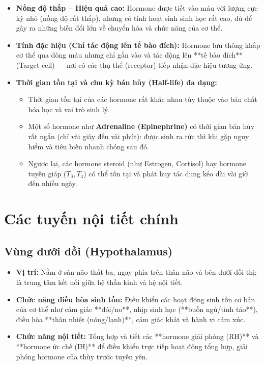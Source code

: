 \begin{itemize}
    \item \textbf{Nồng độ thấp -- Hiệu quả cao:} Hormone được tiết vào máu với lượng cực kỳ nhỏ (nồng độ rất thấp), nhưng có tính hoạt sinh sinh học rất cao, đủ để gây ra những biến đổi lớn về chuyển hóa và chức năng của cơ thể.
    \item \textbf{Tính đặc hiệu (Chỉ tác động lên tế bào đích):} Hormone lưu thông khắp cơ thể qua dòng máu nhưng chỉ gắn vào và tác động lên **tế bào đích** (Target cell) — nơi có các thụ thể (receptor) tiếp nhận đặc hiệu tương ứng.
    \item \textbf{Thời gian tồn tại và chu kỳ bán hủy (Half-life) đa dạng:}
    \begin{itemize}
        \item Thời gian tồn tại của các hormone rất khác nhau tùy thuộc vào bản chất hóa học và vai trò sinh lý.
        \item Một số hormone như \textbf{Adrenaline (Epinephrine)} có thời gian bán hủy rất ngắn (chỉ vài giây đến vài phút): được sinh ra tức thì khi gặp nguy hiểm và tiêu biến nhanh chóng sau đó.
        \item Ngược lại, các hormone steroid (như Estrogen, Cortisol) hay hormone tuyến giáp ($T_3, T_4$) có thể tồn tại và phát huy tác dụng kéo dài vài giờ đến nhiều ngày.
    \end{itemize}
\end{itemize}

\section{Các tuyến nội tiết chính}

\subsection{Vùng dưới đồi (Hypothalamus)}
\begin{itemize}
    \item \textbf{Vị trí:} Nằm ở sàn não thất ba, ngay phía trên thân não và bên dưới đồi thị; là trung tâm kết nối giữa hệ thần kinh và hệ nội tiết.
    \item \textbf{Chức năng điều hòa sinh tồn:} Điều khiển các hoạt động sinh tồn cơ bản của cơ thể như cảm giác **đói/no**, nhịp sinh học (**buồn ngủ/tỉnh táo**), điều hòa **thân nhiệt (nóng/lạnh)**, cảm giác khát và hành vi cảm xúc.
    \item \textbf{Chức năng nội tiết:} Tổng hợp và tiết các **hormone giải phóng (RH)** và **hormone ức chế (IH)** để điều khiển trực tiếp hoạt động tổng hợp, giải phóng hormone của thùy trước tuyến yên.
\end{itemize}

